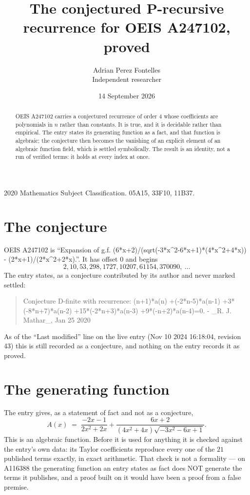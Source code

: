 \documentclass[11pt,a4paper]{article}
\title{The conjectured P-recursive recurrence for OEIS A247102, proved}
\author{Adrian Perez Fontelles\\ \small Independent researcher}
\date{14 September 2026}
\theoremstyle{plain}
\theoremstyle{definition}
\begin{document}
\maketitle

\begin{abstract}
OEIS A247102 carries a conjectured recurrence of order $4$ whose coefficients are polynomials in
$n$ rather than constants. It is true, and it is decidable rather than empirical. The entry
states its generating function as a fact, and that function is algebraic; the conjecture then
becomes the vanishing of an explicit element of an algebraic function field, which is settled
symbolically. The result is an identity, not a run of verified terms: it holds at every index
at once.
\end{abstract}

\noindent\small 2020 Mathematics Subject Classification. 05A15, 33F10, 11B37.\normalsize

\section{The conjecture}

OEIS A247102 is ``Expansion of g.f. (6*x+2)/(sqrt(-3*x\^{}2-6*x+1)*(4*x\^{}2+4*x)) - (2*x+1)/(2*x\^{}2+2*x).''. It has offset $0$ and begins
\[
2, 10, 53, 298, 1727, 10207, 61154, 370090,\ \dots
\]
The entry states, as a conjecture contributed by its author and never marked settled:
\begin{quote}\raggedright\small
Conjecture D-finite with recurrence: (n+1)*a(n) +(-2*n-5)*a(n-1) +3*(-8*n+7)*a(n-2) +15*(-2*n+3)*a(n-3) +9*(-n+2)*a(n-4)=0. - \_R. J. Mathar\_, Jan 25 2020
\end{quote}
As of the ``Last modified'' line on the live entry (Nov 10 2024 16:18:04, revision 43)
this is still recorded as a conjecture, and nothing on the entry records it as proved.

\section{The generating function}

The entry gives, as a statement of fact and not as a conjecture,
\[
A(x)\;=\;\frac{- 2 x - 1}{2 x^{2} + 2 x} + \frac{6 x + 2}{\left(4 x^{2} + 4 x\right) \sqrt{- 3 x^{2} - 6 x + 1}} .
\]
This is an algebraic function. Before it is used for anything it is checked against the entry's
own data: its Taylor coefficients reproduce every one of the $21$ published terms
exactly, in exact arithmetic. That check is not a formality --- on A116388 the generating
function an entry states as fact does NOT generate the terms it publishes, and a proof built on
it would have been a proof from a false premise.
\end{document}
